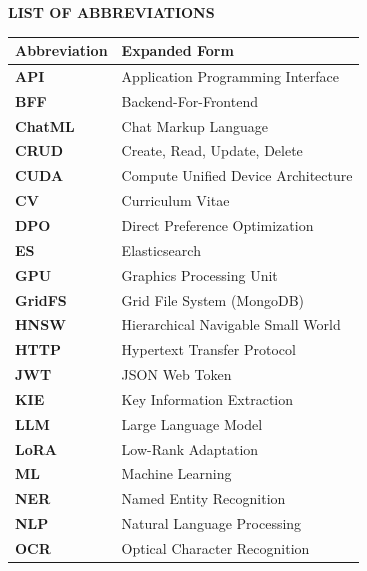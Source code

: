 \documentclass[12pt, a4paper]{report}
\begin{document}
\newpage
{}
\begin{center}
    {\LARGE \textbf{LIST OF ABBREVIATIONS}\par}
\end{center}
\vspace{1cm}

\begin{table}[h!]
    \centering
    \normalsize
    \renewcommand{\arraystretch}{1.5}
    \begin{tabularx}{\textwidth}{Z{0.44} | Z{1.56}}
        \textbf{Abbreviation} & \textbf{Expanded Form} \\ \hline
        \textbf{API} & Application Programming Interface \\
        \textbf{BFF} & Backend-For-Frontend \\
        \textbf{ChatML} & Chat Markup Language \\
        \textbf{CRUD} & Create, Read, Update, Delete \\
        \textbf{CUDA} & Compute Unified Device Architecture \\
        \textbf{CV} & Curriculum Vitae \\
        \textbf{DPO} & Direct Preference Optimization \\
        \textbf{ES} & Elasticsearch \\
        \textbf{GPU} & Graphics Processing Unit \\
        \textbf{GridFS} & Grid File System (MongoDB) \\
        \textbf{HNSW} & Hierarchical Navigable Small World \\
        \textbf{HTTP} & Hypertext Transfer Protocol \\
        \textbf{JWT} & JSON Web Token \\
        \textbf{KIE} & Key Information Extraction \\
        \textbf{LLM} & Large Language Model \\
        \textbf{LoRA} & Low-Rank Adaptation \\
        \textbf{ML} & Machine Learning \\
        \textbf{NER} & Named Entity Recognition \\
        \textbf{NLP} & Natural Language Processing \\
        \textbf{OCR} & Optical Character Recognition \\
    \end{tabularx}
\end{table}
\end{document}
